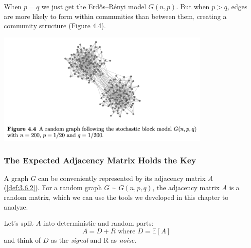 When $p = q$ we just get the Erdős–Rényi model $G(n, p)$. But when $p > q$, edges are more likely to form within 
communities than between them, creating a community structure (Figure 4.4).

\begin{center}
	\includegraphics[width=0.8\textwidth]{Chapter 4/fig4-4.png}
\end{center}


\subsubsection{The Expected Adjacency Matrix Holds the Key}
A graph $G$ can be conveniently represented by its adjacency matrix $A$ (\cref{def:3.6.2}). For a random graph 
$G \sim G(n, p, q)$, the adjacency matrix $A$ is a random matrix, which we can use the tools we developed in 
this chapter to analyze.

Let's split $A$ into deterministic and random parts: 
\[ A = D + R \text{ where } D = \mathbb{E}\left[ A \right] \]
and think of $D$ as the \textit{signal} and R as \textit{noise}.

